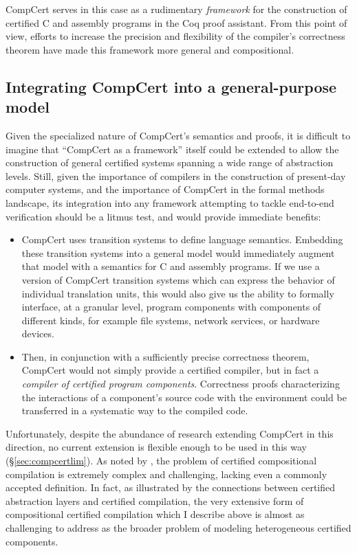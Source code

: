 \documentclass[11pt,oneside]{book}
\theoremstyle{definition}
\begin{document}
CompCert serves in this case as
a rudimentary \emph{framework} for the construction of
certified C and assembly programs
in the Coq proof assistant.
From this point of view,
efforts to increase the precision and flexibility
of the compiler's correctness theorem
have made this framework more general and compositional.

\subsection{Integrating CompCert into a general-purpose model}

Given the specialized nature
of CompCert's semantics and proofs,
it is difficult to imagine
that ``CompCert as a framework'' itself
could be extended
to allow the construction of general certified systems
spanning a wide range of abstraction levels.
Still,
given the importance of compilers in
the construction of present-day computer systems,
and the importance of CompCert in the formal methods landscape,
its integration into any framework
attempting to tackle end-to-end verification
should be a litmus test,
and would provide immediate benefits:
\begin{itemize}
  \item
    CompCert uses transition systems to define language semantics.
    Embedding these transition systems
    into a general model
    would immediately augment that model with
    a semantics for C and assembly programs.
    If we use a version of CompCert transition systems
    which can express the behavior of individual translation units,
    this would also give us the ability to
    formally interface, at a granular level,
    program components with components of different kinds,
    for example
    file systems, network services, or hardware devices.
  \item
    Then,
    in conjunction with a sufficiently precise
    correctness theorem,
    CompCert would not simply provide
    a certified compiler,
    but in fact
    a \emph{compiler of certified program components}.
    Correctness proofs characterizing
    the interactions of a component's source code with the environment
    could be transferred in a systematic way
    to the compiled code.
\end{itemize}

Unfortunately,
despite the abundance of research
extending CompCert in this direction,
no current extension is flexible enough to be used in this way
(\S\ref{sec:compcertlim}).
As noted by \citet{next700},
the problem of certified compositional compilation
is extremely complex and challenging,
lacking even a commonly accepted definition.
In fact,
as illustrated by the connections between
certified abstraction layers and
certified compilation,
the very extensive form of
compositional certified compilation
which I describe above
is almost as challenging to address
as the broader problem of
modeling heterogeneous certified components.
\end{document}

